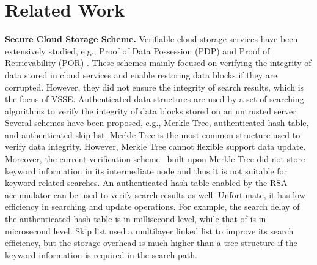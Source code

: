  \section{Related Work}
  \noindent\textbf{Secure Cloud Storage Scheme.} Verifiable cloud storage services have been extensively studied, e.g., Proof of Data Possession (PDP) \cite{ateniese2007provable, ateniese2008scalable, erway2015dynamic,zhu2012cooperative} and Proof of Retrievability (POR) \cite{juels2007pors, bowers2009proofs, stefanov2012iris}. These schemes mainly focused on verifying the integrity of data stored in cloud services and enable restoring data blocks if they are corrupted. However, they did not ensure the integrity of search results, which is the focus of VSSE.
  Authenticated data structures are used by a set of searching algorithms to verify the integrity of data blocks stored on an untrusted server. Several schemes have been proposed, e.g., Merkle Tree\cite{merkle1987digital}, authenticated hash table\cite{papamanthou2008authenticated}, and authenticated skip list\cite{pugh1990skip,goodrich2001implementation}. Merkle Tree is the most common structure used to verify data integrity. However, Merkle Tree cannot flexible support data update. %
  Moreover, the current verification scheme~\cite{kamara2011cs2} built upon Merkle Tree did not store keyword information in its intermediate node and thus it is not suitable for keyword related searches. An authenticated hash table enabled by the RSA accumulator can be used to verify search results as well. Unfortunate, it has low efficiency in searching and update operations. For example, the search delay of the authenticated hash table is in millisecond level, while that of %
	is in microsecond level. Skip list used a multilayer linked list to improve its search efficiency, but the storage overhead is much higher than a tree structure if the keyword information is required in the search path.

